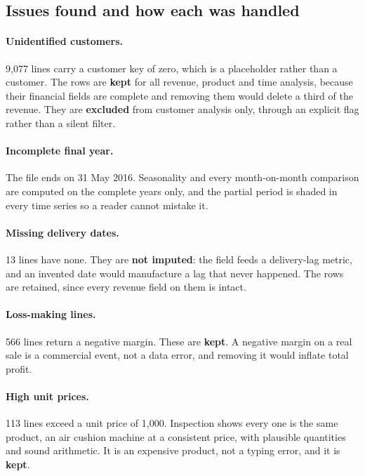 \documentclass[11pt,a4paper]{article}
\begin{document}
\subsection{Issues found and how each was handled}

\paragraph{Unidentified customers.} 9{,}077 lines carry a customer key of zero,
which is a placeholder rather than a customer. The rows are \textbf{kept} for all
revenue, product and time analysis, because their financial fields are complete and
removing them would delete a third of the revenue. They are \textbf{excluded} from
customer analysis only, through an explicit flag rather than a silent filter.

\paragraph{Incomplete final year.} The file ends on 31 May 2016. Seasonality and every
month-on-month comparison are computed on the complete years only, and the partial
period is shaded in every time series so a reader cannot mistake it.

\paragraph{Missing delivery dates.} 13 lines have none. They are
\textbf{not imputed}: the field feeds a delivery-lag metric, and an invented date would
manufacture a lag that never happened. The rows are retained, since every revenue field
on them is intact.

\paragraph{Loss-making lines.} 566 lines return a negative margin.
These are \textbf{kept}. A negative margin on a real sale is a commercial event, not a
data error, and removing it would inflate total profit.

\paragraph{High unit prices.} 113 lines exceed a unit price of 1{,}000.
Inspection shows every one is the same product, an air cushion machine at a consistent
price, with plausible quantities and sound arithmetic. It is an expensive product, not a
typing error, and it is \textbf{kept}.
\end{document}

